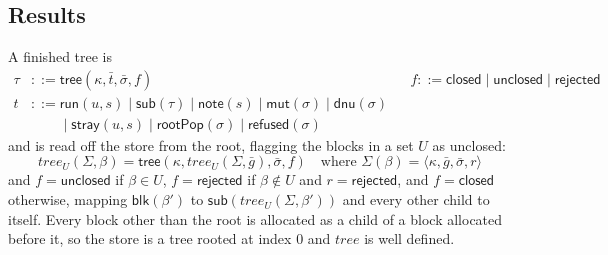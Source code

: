 \documentclass[11pt]{article}
\numberwithin{equation}{section}
\newcommand{\kw}[1]{\ensuremath{\mathsf{#1}}}
\begin{document}
\subsection{Results}
\label{sec:interp-results}

A finished tree is
\begin{equation}\label{eq:trees}
\begin{aligned}
\tau &::= \kw{tree}(\kappa, \bar t, \bar\sigma, f)
  && f ::= \kw{closed} \mid \kw{unclosed} \mid \kw{rejected} \\
t &::= \kw{run}(u, s) \mid \kw{sub}(\tau) \mid \kw{note}(s)
  \mid \kw{mut}(\sigma) \mid \kw{dnu}(\sigma) \\
  &\phantom{{}::={}} \mid \kw{stray}(u, s)
  \mid \kw{rootPop}(\sigma) \mid \kw{refused}(\sigma)
\end{aligned}
\end{equation}
and is read off the store from the root, flagging the blocks in a set $U$
as unclosed:
\begin{equation}\label{eq:read-tree}
\mathit{tree}_U(\Sigma, \beta) =
  \kw{tree}(\kappa, \mathit{tree}_U(\Sigma, \bar g), \bar\sigma, f)
\quad\text{where } \Sigma(\beta) = \langle \kappa, \bar g, \bar\sigma, r \rangle
\end{equation}
and $f = \kw{unclosed}$ if $\beta \in U$, $f = \kw{rejected}$ if
$\beta \notin U$ and $r = \kw{rejected}$, and $f = \kw{closed}$ otherwise,
mapping $\kw{blk}(\beta')$ to $\kw{sub}(\mathit{tree}_U(\Sigma, \beta'))$
and every other child to itself.  Every block other than the root is
allocated as a child of a block allocated before it, so the store is a
tree rooted at index 0 and $\mathit{tree}$ is well defined.
\end{document}
